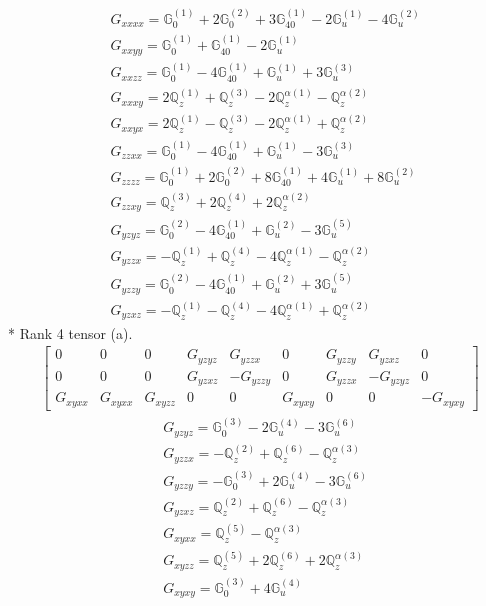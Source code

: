 \documentclass[fleqn,8pt,landscape]{jsarticle}
\begin{document}
\begin{align*}
& G_{xxxx} = \mathbb{G}_{0}^{(1)} + 2 \mathbb{G}_{0}^{(2)} + 3 \mathbb{G}_{40}^{(1)} - 2 \mathbb{G}_{u}^{(1)} - 4 \mathbb{G}_{u}^{(2)} \\
& G_{xxyy} = \mathbb{G}_{0}^{(1)} + \mathbb{G}_{40}^{(1)} - 2 \mathbb{G}_{u}^{(1)} \\
& G_{xxzz} = \mathbb{G}_{0}^{(1)} - 4 \mathbb{G}_{40}^{(1)} + \mathbb{G}_{u}^{(1)} + 3 \mathbb{G}_{u}^{(3)} \\
& G_{xxxy} = 2 \mathbb{Q}_{z}^{(1)} + \mathbb{Q}_{z}^{(3)} - 2 \mathbb{Q}_{z}^{\alpha(1)} - \mathbb{Q}_{z}^{\alpha(2)} \\
& G_{xxyx} = 2 \mathbb{Q}_{z}^{(1)} - \mathbb{Q}_{z}^{(3)} - 2 \mathbb{Q}_{z}^{\alpha(1)} + \mathbb{Q}_{z}^{\alpha(2)} \\
& G_{zzxx} = \mathbb{G}_{0}^{(1)} - 4 \mathbb{G}_{40}^{(1)} + \mathbb{G}_{u}^{(1)} - 3 \mathbb{G}_{u}^{(3)} \\
& G_{zzzz} = \mathbb{G}_{0}^{(1)} + 2 \mathbb{G}_{0}^{(2)} + 8 \mathbb{G}_{40}^{(1)} + 4 \mathbb{G}_{u}^{(1)} + 8 \mathbb{G}_{u}^{(2)} \\
& G_{zzxy} = \mathbb{Q}_{z}^{(3)} + 2 \mathbb{Q}_{z}^{(4)} + 2 \mathbb{Q}_{z}^{\alpha(2)} \\
& G_{yzyz} = \mathbb{G}_{0}^{(2)} - 4 \mathbb{G}_{40}^{(1)} + \mathbb{G}_{u}^{(2)} - 3 \mathbb{G}_{u}^{(5)} \\
& G_{yzzx} = - \mathbb{Q}_{z}^{(1)} + \mathbb{Q}_{z}^{(4)} - 4 \mathbb{Q}_{z}^{\alpha(1)} - \mathbb{Q}_{z}^{\alpha(2)} \\
& G_{yzzy} = \mathbb{G}_{0}^{(2)} - 4 \mathbb{G}_{40}^{(1)} + \mathbb{G}_{u}^{(2)} + 3 \mathbb{G}_{u}^{(5)} \\
& G_{yzxz} = - \mathbb{Q}_{z}^{(1)} - \mathbb{Q}_{z}^{(4)} - 4 \mathbb{Q}_{z}^{\alpha(1)} + \mathbb{Q}_{z}^{\alpha(2)}
\end{align*}
* Rank 4 tensor (a).
\begin{align*}
\begin{bmatrix} 0 & 0 & 0 & G_{yzyz} & G_{yzzx} & 0 & G_{yzzy} & G_{yzxz} & 0 \\ 0 & 0 & 0 & G_{yzxz} & - G_{yzzy} & 0 & G_{yzzx} & - G_{yzyz} & 0 \\ G_{xyxx} & G_{xyxx} & G_{xyzz} & 0 & 0 & G_{xyxy} & 0 & 0 & - G_{xyxy} \end{bmatrix}
\end{align*}
\begin{align*}
& G_{yzyz} = \mathbb{G}_{0}^{(3)} - 2 \mathbb{G}_{u}^{(4)} - 3 \mathbb{G}_{u}^{(6)} \\
& G_{yzzx} = - \mathbb{Q}_{z}^{(2)} + \mathbb{Q}_{z}^{(6)} - \mathbb{Q}_{z}^{\alpha(3)} \\
& G_{yzzy} = - \mathbb{G}_{0}^{(3)} + 2 \mathbb{G}_{u}^{(4)} - 3 \mathbb{G}_{u}^{(6)} \\
& G_{yzxz} = \mathbb{Q}_{z}^{(2)} + \mathbb{Q}_{z}^{(6)} - \mathbb{Q}_{z}^{\alpha(3)} \\
& G_{xyxx} = \mathbb{Q}_{z}^{(5)} - \mathbb{Q}_{z}^{\alpha(3)} \\
& G_{xyzz} = \mathbb{Q}_{z}^{(5)} + 2 \mathbb{Q}_{z}^{(6)} + 2 \mathbb{Q}_{z}^{\alpha(3)} \\
& G_{xyxy} = \mathbb{G}_{0}^{(3)} + 4 \mathbb{G}_{u}^{(4)}
\end{align*}
\end{document}
